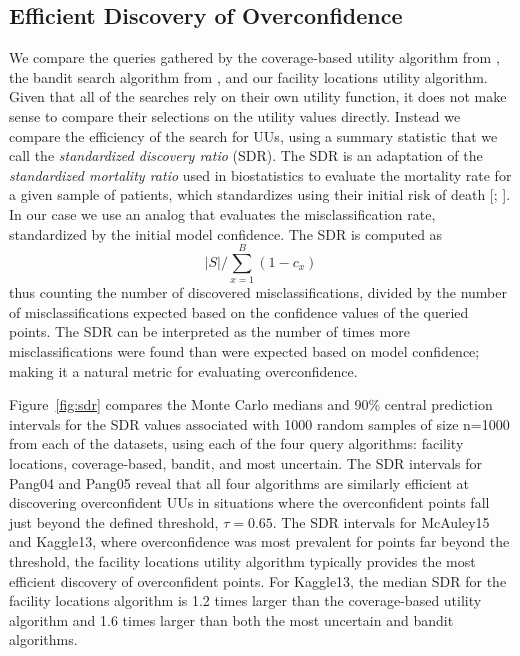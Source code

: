 \documentclass[conference]{IEEEtran}
\begin{document}
\subsection{Efficient Discovery of Overconfidence}

We compare the queries gathered by the coverage-based utility algorithm from \cite{Bansal2018}, the bandit search algorithm from \cite{Lakkaraju2016}, and our facility locations utility algorithm. Given that all of the searches rely on their own utility function, it does not make sense to compare their selections on the utility values directly. Instead we compare the efficiency of the search for UUs, using a summary statistic that we call the \textit{standardized discovery ratio} (SDR). The SDR is an adaptation of the \textit{standardized mortality ratio} used in biostatistics to evaluate the mortality rate for a given sample of patients, which standardizes using their initial risk of death [\citealt{taylor2013standardized}; \citealt{rosner2015fundamentals}]. In our case we use an analog that evaluates the misclassification rate, standardized by the initial model confidence. The SDR is computed as 
$$ |S| / \sum_{x=1}^B(1- c_x) $$
thus counting the number of discovered misclassifications, divided by the number of misclassifications expected based on the confidence values of the queried points. The SDR can be interpreted as the number of times more misclassifications were found than were expected based on model confidence; making it a natural metric for evaluating overconfidence.

Figure~\ref{fig:sdr} compares the Monte Carlo medians and 90\%  central prediction intervals for the SDR values associated with 1000 random samples of size n=1000 from each of the datasets, using each of the four query algorithms: facility locations, coverage-based, bandit, and most uncertain. The SDR intervals for Pang04 and Pang05 reveal that all four algorithms are similarly efficient at discovering overconfident UUs in situations where the overconfident points fall just beyond the defined threshold, $\tau = 0.65$. The SDR intervals for McAuley15 and Kaggle13, where overconfidence was most prevalent for points far beyond the threshold, the facility locations utility algorithm typically provides the most efficient discovery of overconfident points. For Kaggle13, the median SDR for the facility locations algorithm is 1.2 times larger than the coverage-based utility algorithm and 1.6 times larger than both the most uncertain and bandit algorithms.
\end{document}
